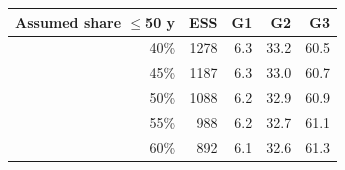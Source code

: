 \begin{tabular}{rrrrr}
\toprule
Assumed share $\le$50 y & ESS & G1 & G2 & G3 \\
\midrule
40\% & 1278 & 6.3 & 33.2 & 60.5 \\
45\% & 1187 & 6.3 & 33.0 & 60.7 \\
50\% & 1088 & 6.2 & 32.9 & 60.9 \\
55\% & 988 & 6.2 & 32.7 & 61.1 \\
60\% & 892 & 6.1 & 32.6 & 61.3 \\
\bottomrule
\end{tabular}
